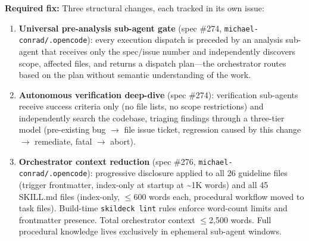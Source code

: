 \documentclass[11pt,a4paper]{article}
\begin{document}
\begin{gapbox}
\begin{enumerate}[leftmargin=*]
\end{enumerate}

\textbf{Required fix:}  Three structural changes, each tracked in its own issue:

\begin{enumerate}[leftmargin=*]
  \item [(i)] \textbf{Universal pre-analysis sub-agent gate} (spec \#274, \texttt{michael-conrad/.opencode}): every execution dispatch is preceded by an analysis sub-agent that receives only the spec/issue number and independently discovers scope, affected files, and returns a dispatch plan---the orchestrator routes based on the plan without semantic understanding of the work.
  \item [(ii)] \textbf{Autonomous verification deep-dive} (spec \#274): verification sub-agents receive success criteria only (no file lists, no scope restrictions) and independently search the codebase, triaging findings through a three-tier model (pre-existing bug $\to$ file issue ticket, regression caused by this change $\to$ remediate, fatal $\to$ abort).
  \item [(iii)] \textbf{Orchestrator context reduction} (spec \#276, \texttt{michael-conrad/.opencode}): progressive disclosure applied to all 26 guideline files (trigger frontmatter, index-only at startup at \textasciitilde{}1K words) and all 45 SKILL.md files (index-only, $\leq$600 words each, procedural workflow moved to task files).  Build-time \texttt{skildeck lint} rules enforce word-count limits and frontmatter presence.  Total orchestrator context $\leq$2,500 words.  Full procedural knowledge lives exclusively in ephemeral sub-agent windows.
\end{enumerate}
\end{gapbox}
\end{document}
